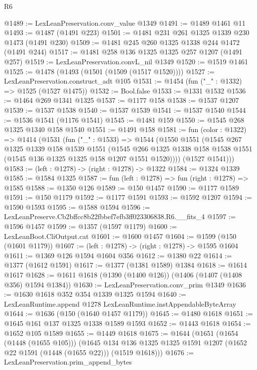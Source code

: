 \begin{lexlean}{R6}
\begin{coremodule}
@1489 := LexLeanPreservation.conv_value @1349
@1491 := @1489 @1461 @11
@1493 := @1487 (@1491 @223)
@1501 := @1481 @231 @261 @1325 @1339 @230 @1473 (@1491 @230)
@1509 := @1481 @245 @260 @1325 @1338 @244 @1472 (@1491 @244)
@1517 := @1481 @258 @136 @1325 @1325 @257 @1207 (@1491 @257)
@1519 := LexLeanPreservation.convL_nil @1349
@1520 := @1519 @1461
@1525 := @1478 (@1493 (@1501 (@1509 (@1517 @1520))))
@1527 := LexLeanPreservation.construct_adt @105
@1531 := @1454 (fun ("_" : @1332) => @1525 (@1527 @1475))
@1532 := Bool.false
@1533 := @1331 @1532
@1536 := @1464 @269 @1341 @1325
@1537 := @1177 @158
@1538 := @1537 @1207
@1539 := @1537 @1538
@1540 := @1537 @1539
@1541 := @1537 @1540
@1544 := @1536 @1541 (@1176 @1541)
@1545 := @1481 @159
@1550 := @1545 @268 @1325 @1340 @158 @1540
@1551 := @1491 @158
@1581 := fun (color : @1322) =>
  @1414
    (@1531
      (fun ("_" : @1533) =>
      @1544
        (@1550
          @1551
          (@1545
            @267
            @1325
            @1339
            @158
            @1539
            @1551
            (@1545
              @266
              @1325
              @1338
              @158
              @1538
              @1551
              (@1545 @136 @1325 @1325 @158 @1207 @1551 @1520))))
        (@1527 @1541)))
@1583 := (left : @1278) -> (right : @1278) -> @1322
@1584 := @1324 @1339
@1585 := @1584 @1325
@1587 := fun (left : @1278) => fun (right : @1278) => @1585
@1588 := @1350 @126
@1589 := @150 @1457
@1590 := @1177 @1589
@1591 := @150 @1179
@1592 := @1177 @1591
@1593 := @1592 @1207
@1594 := @1590 @1593
@1595 := @1588 @1594
@1596 := LexLeanPreserve.Cb2bffcc8b22fbbef7efb3ff023306838.R6.__fits_4
@1597 := @1596 @1457
@1599 := @1357 (@1597 @1179)
@1600 := LexLeanBoot.CliOutput.cat
@1601 := @1600 @1457
@1604 := @1599 (@150 (@1601 @1179))
@1607 := (left : @1278) -> (right : @1278) -> @1595 @1604
@1611 := @1369 @126 @1594 @1604 @356
@1612 := @1380 @22
@1614 := @1377 (@1612 @1591)
@1617 := @1377 (@1381 @1589) @1384
@1618 := @1614 @1617
@1628 := @1611 @1618 (@1390 (@1400 @126)) (@1406 (@1407 (@1408 @356) @1594 @1384))
@1630 := LexLeanPreservation.conv_prim @1349
@1636 := @1630 @1618 @352 @354 @1339 @1325 @1594
@1640 := LexLeanRuntime.append @1278 LexLeanRuntime.instAppendableByteArray
@1644 := @1636 (@150 (@1640 @1457 @1179))
@1645 := @1480 @1618
@1651 := @1645 @161 @137 @1325 @1338 @1589 @1593
@1652 := @1443 @1618
@1654 := @1652 @105 @1589
@1655 := @1449 @1618
@1675 := @1644
    (@1651
      (@1654 (@1448 (@1655 @105)))
      (@1645 @134 @136 @1325 @1325 @1591 @1207 (@1652 @22 @1591 (@1448 (@1655 @22))) (@1519 @1618)))
@1676 := LexLeanPreservation.prim_append_bytes

\end{coremodule}
\end{lexlean}
